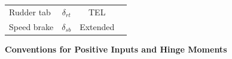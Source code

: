 \documentclass[
]{book}
\begin{document}
\begin{longtable}[]{@{}lccc@{}}
\begin{minipage}[t]{0.19\columnwidth}
Rudder tab\strut
\end{minipage} & \begin{minipage}[t]{0.14\columnwidth}\centering
\(\delta_{rt}\)\strut
\end{minipage} & \begin{minipage}[t]{0.29\columnwidth}\centering
TEL\strut
\end{minipage} & \begin{minipage}[t]{0.27\columnwidth}\centering
\strut
\end{minipage}\tabularnewline
\begin{minipage}[t]{0.19\columnwidth}\raggedright
Speed brake\strut
\end{minipage} & \begin{minipage}[t]{0.14\columnwidth}\centering
\(\delta_{sb}\)\strut
\end{minipage} & \begin{minipage}[t]{0.29\columnwidth}\centering
Extended\strut
\end{minipage} & \begin{minipage}[t]{0.27\columnwidth}\centering
\strut
\end{minipage}\tabularnewline
\bottomrule
\end{longtable}

\textbf{Conventions for Positive Inputs and Hinge Moments}
\end{document}
